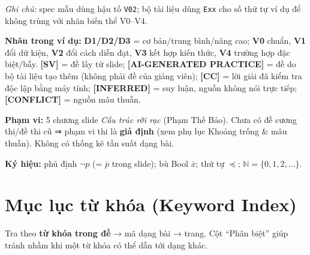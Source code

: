 \documentclass[
  10pt,
  twoside,openany]{book}
\begin{document}
\emph{Ghi chú:} spec mẫu dùng hậu tố \texttt{V02}; bộ tài liệu dùng
\texttt{Exx} cho số thứ tự ví dụ để không trùng với nhãn biến thể
V0--V4.

\textbf{Nhãn trong ví dụ:} \textbf{D1/D2/D3} = cơ bản/trung bình/nâng
cao; \textbf{V0} chuẩn, \textbf{V1} đổi dữ kiện, \textbf{V2} đổi cách
diễn đạt, \textbf{V3} kết hợp kiến thức, \textbf{V4} trường hợp đặc
biệt/bẫy. \textbf{{[}SV{]}} = đề lấy từ slide; \textbf{{[}AI-GENERATED
PRACTICE{]}} = đề do bộ tài liệu tạo thêm (không phải đề của giảng
viên); \textbf{{[}CC{]}} = lời giải đã kiểm tra độc lập bằng máy tính;
\textbf{{[}INFERRED{]}} = suy luận, nguồn không nói trực tiếp;
\textbf{{[}CONFLICT{]}} = nguồn mâu thuẫn.

\textbf{Phạm vi:} 5 chương slide \emph{Cấu trúc rời rạc} (Phạm Thế Bảo).
Chưa có đề cương thi/đề thi cũ ⇒ phạm vi thi là \textbf{giả định} (xem
phụ lục Khoảng trống \& mâu thuẫn). Không có thống kê tần suất dạng bài.

\textbf{Ký hiệu:} phủ định \(\neg p\) (= \(\bar p\) trong slide); bù
Bool \(\bar x\); thứ tự \(\preceq\); \(\mathbb N=\{0,1,2,\dots\}\).

\hypertarget{keyword-index}{%
\chapter{Mục lục từ khóa (Keyword Index)}\label{keyword-index}}

Tra theo \textbf{từ khóa trong đề} → mã dạng bài → trang. Cột ``Phân
biệt'' giúp tránh nhầm khi một từ khóa có thể dẫn tới dạng khác.
\end{document}
